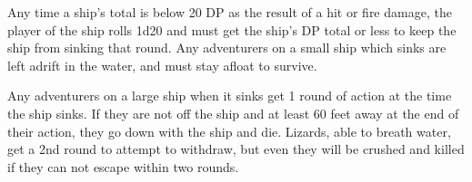Any time a ship's total is below 20 DP as the result of a hit or fire damage, the player of the ship rolls 1d20 and must get the ship's DP total or less to keep the ship from sinking that round. Any adventurers on a small ship which sinks are left adrift in the water, and must stay afloat to survive.

Any adventurers on a large ship when it sinks get 1 round of action at the time the ship sinks. If they are not off the ship and at least 60 feet away at the end of their action, they go down with the ship and die. Lizards, able to breath water, get a 2nd round to attempt to withdraw, but even they will be crushed and killed if they can not escape within two rounds.
